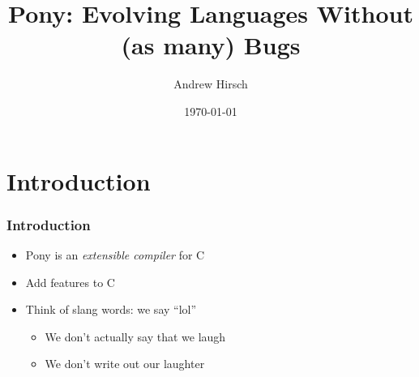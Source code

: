 \documentclass[bigger]{beamer}
\title{Pony: Evolving Languages Without (as many) Bugs}
\author{Andrew Hirsch}
\date{\today}
\begin{document}
\maketitle



\section{Introduction}
\label{sec-1}
\begin{frame}
\frametitle{Introduction}
\label{sec-1-1}



\begin{itemize}
\item Pony is an \emph{extensible compiler} for C
\item Add features to C
\item Think of slang words: we say ``lol''
\begin{itemize}
\item We don't actually say that we laugh
\item We don't write out our laughter
\end{itemize}
\end{itemize}
\end{frame}
\end{document}
